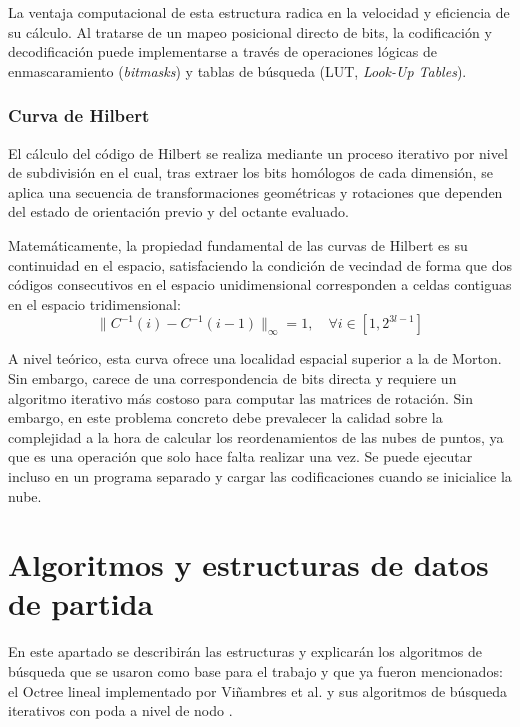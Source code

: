 La ventaja computacional de esta estructura radica en la velocidad y eficiencia de su cálculo. Al tratarse de un mapeo posicional directo de bits, la codificación y decodificación puede implementarse a través de operaciones lógicas de enmascaramiento (\textit{bitmasks}) y tablas de búsqueda (LUT, \textit{Look-Up Tables}).

\subsubsection{Curva de Hilbert}
El cálculo del código de Hilbert se realiza mediante un proceso iterativo por nivel de subdivisión en el cual, tras extraer los bits homólogos de cada dimensión, se aplica una secuencia de transformaciones geométricas y rotaciones que dependen del estado de orientación previo y del octante evaluado.


Matemáticamente, la propiedad fundamental de las curvas de Hilbert es su continuidad en el espacio, satisfaciendo la condición de vecindad de forma que dos códigos consecutivos en el espacio unidimensional corresponden a celdas contiguas en el espacio tridimensional:
\begin{equation}
    \|C^{-1}(i) - C^{-1}(i - 1)\|_\infty = 1, \quad \forall i \in [1, 2^{3l-1}]
\end{equation}

A nivel teórico, esta curva ofrece una localidad espacial superior a la de Morton. Sin embargo, carece de una correspondencia de bits directa y requiere un algoritmo iterativo más costoso para computar las matrices de rotación. Sin embargo, en este problema concreto debe prevalecer la calidad sobre la complejidad a la hora de calcular los reordenamientos de las nubes de puntos, ya que es una operación que solo hace falta realizar una vez. Se puede ejecutar incluso en un programa separado y cargar las codificaciones cuando se inicialice la nube.

\section{Algoritmos y estructuras de datos de partida}
En este apartado se describirán las estructuras y explicarán los algoritmos de búsqueda que se usaron como base para el trabajo y que ya fueron mencionados: el Octree lineal implementado por Viñambres et al. y sus algoritmos de búsqueda iterativos con poda a nivel de nodo \cite{Vinambres}.

